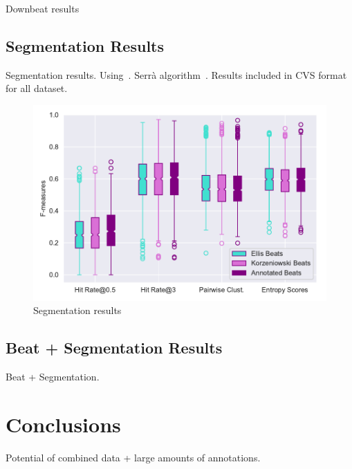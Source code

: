 \documentclass{article}
\begin{document}
Downbeat results

\subsection{Segmentation Results}

Segmentation results. Using~\cite{Nieto2016}. Serr\`a algorithm~\cite{Serra2014}. Results included in CVS format for all dataset.

\begin{figure}
    \centerline{\includegraphics[width=\columnwidth]{figs/segment_results.pdf}}
    \caption{Segmentation results}
    \label{fig:segment_results}
\end{figure}

\subsection{Beat + Segmentation Results}

Beat + Segmentation.

\section{Conclusions}\label{sec:conclusions}

Potential of combined data + large amounts of annotations.


\end{document}
